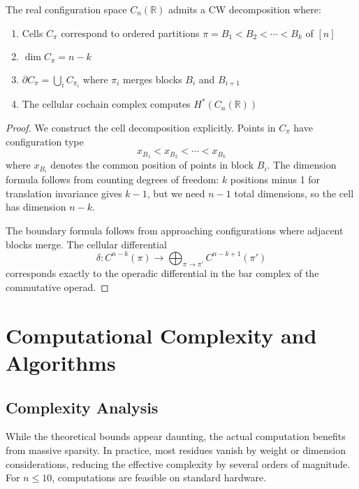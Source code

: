 \begin{theorem}
The real configuration space $C_n(\mathbb{R})$ admits a CW decomposition where:
\begin{enumerate}
\item Cells $C_\pi$ correspond to ordered partitions $\pi = B_1 < B_2 < \cdots < B_k$ of $[n]$
\item $\dim C_\pi = n - k$
\item $\partial C_\pi = \bigcup_{i} C_{\pi_i}$ where $\pi_i$ merges blocks $B_i$ and $B_{i+1}$
\item The cellular cochain complex computes $H^*(C_n(\mathbb{R}))$
\end{enumerate}
\end{theorem} 
\begin{proof}
We construct the cell decomposition explicitly. Points in $C_\pi$ have configuration type
\[
x_{B_1} < x_{B_2} < \cdots < x_{B_k}
\]
where $x_{B_i}$ denotes the common position of points in block $B_i$. The dimension formula follows from counting degrees of freedom: $k$ positions minus 1 for translation invariance gives $k-1$, but we need $n-1$ total dimensions, so the cell has dimension $n-k$.
 
The boundary formula follows from approaching configurations where adjacent blocks merge. The cellular differential
\[
\delta: C^{n-k}(\pi) \to \bigoplus_{\pi \to \pi'} C^{n-k+1}(\pi')
\]
corresponds exactly to the operadic differential in the bar complex of the commutative operad.
\end{proof}
 
\section{Computational Complexity and Algorithms}
 
\subsection{Complexity Analysis}

\begin{remark}
While the theoretical bounds appear daunting,
the actual computation benefits from massive sparsity. In practice, most residues vanish
by weight or dimension considerations, reducing the effective complexity by several orders
of magnitude. For $n \leq 10$, computations are feasible on standard hardware.
\end{remark}

